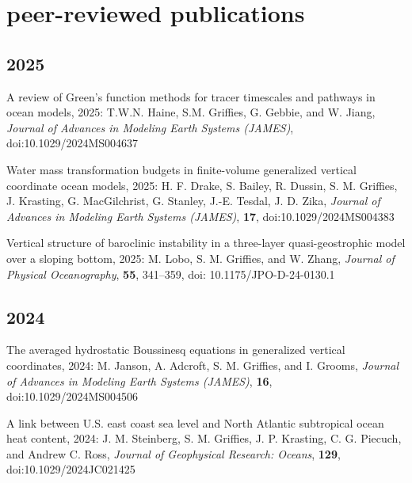 \section*{\sc \color{Maroon} peer-reviewed publications}

\small 

\begin{etaremune}

\subsection*{\sc \color{Maroon} 2025}

\item A review of Green's function methods for tracer timescales and pathways in ocean models, 2025: T.W.N. Haine, S.M. Grif\/f\/ies, G. Gebbie, and W. Jiang, {\it Journal of Advances in Modeling Earth Systems (JAMES)}, doi:10.1029/2024MS004637

\item Water mass transformation budgets in finite-volume generalized vertical coordinate ocean models, 2025: H. F. Drake, S. Bailey, R. Dussin, S. M. Griffies, J. Krasting, G. MacGilchrist, G. Stanley, J.-E. Tesdal, J. D. Zika, {\it Journal of Advances in Modeling Earth Systems (JAMES)}, {\bf 17}, doi:10.1029/2024MS004383

\item Vertical structure of baroclinic instability in a three-layer quasi-geostrophic model over a sloping bottom, 2025: M. Lobo, S. M. Grif\/f\/ies, and W. Zhang, {\it Journal of Physical Oceanography}, {\bf 55}, 341--359, 
doi: 10.1175/JPO-D-24-0130.1

\subsection*{\sc \color{Maroon} 2024}

\item The averaged hydrostatic Boussinesq equations in generalized vertical coordinates, 2024: M. Janson, A. Adcroft, S. M. Grif\/f\/ies, and I. Grooms, {\it Journal of Advances in Modeling Earth Systems (JAMES)}, {\bf 16}, doi:10.1029/2024MS004506

\item A link between U.S. east coast sea level and North Atlantic subtropical ocean heat content, 2024:  J. M. Steinberg, S. M. Grif\/f\/ies, J. P. Krasting, C. G. Piecuch, and Andrew C. Ross, {\it Journal of Geophysical Research: Oceans}, {\bf 129}, doi:10.1029/2024JC021425



\end{etaremune}
